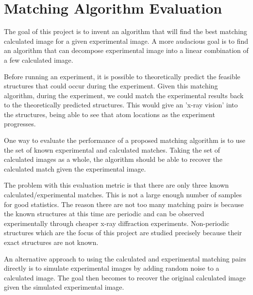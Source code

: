 \documentclass[12pt,letterpaper]{article}
\begin{document}
\clearpage

\section{Matching Algorithm Evaluation}

The goal of this project is to invent an algorithm that will find the best
matching calculated image for a given experimental image. A more audacious goal
is to find an algorithm that can decompose experimental image into a linear
combination of a few calculated image.

Before running an experiment, it is possible to theoretically predict the
feasible structures that could occur during the experiment. Given this matching
algorithm, during the experiment, we could match the experimental results back
to the theoretically predicted structures. This would give an 'x-ray vision' into
the structures, being able to see that atom locations as the experiment
progresses.

One way to evaluate the performance of a proposed matching algorithm is to use
the set of known experimental and calculated matches. Taking the set of
calculated images as a whole, the algorithm should be able to recover the
calculated match given the experimental image. 

The problem with this evaluation metric is that there are only three known
calculated/experimental matches. This is not a large enough number of samples
for good statistics. The reason there are not too many matching pairs is because
the known structures at this time are periodic and can be observed
experimentally through cheaper x-ray diffraction experiments. Non-periodic
structures which are the focus of this project are studied precisely because
their exact structures are not known.

An alternative approach to using the calculated and experimental matching pairs
directly is to simulate experimental images by adding random noise to a
calculated image. The goal then becomes to recover the original calculated image
given the simulated experimental image.
\end{document}
